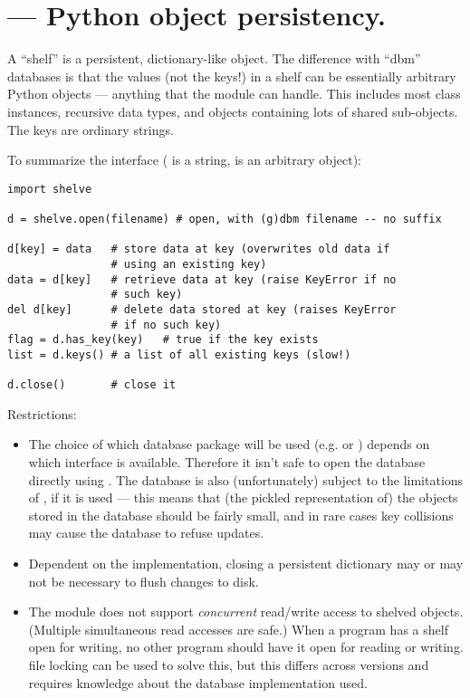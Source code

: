 \section{ ---
         Python object persistency.}



A ``shelf'' is a persistent, dictionary-like object.  The difference
with ``dbm'' databases is that the values (not the keys!) in a shelf
can be essentially arbitrary Python objects --- anything that the
 module can handle.  This includes most class instances,
recursive data types, and objects containing lots of shared
sub-objects.  The keys are ordinary strings.

To summarize the interface ( is a string,  is an
arbitrary object):

\begin{verbatim}
import shelve

d = shelve.open(filename) # open, with (g)dbm filename -- no suffix

d[key] = data   # store data at key (overwrites old data if
                # using an existing key)
data = d[key]   # retrieve data at key (raise KeyError if no
                # such key)
del d[key]      # delete data stored at key (raises KeyError
                # if no such key)
flag = d.has_key(key)   # true if the key exists
list = d.keys() # a list of all existing keys (slow!)

d.close()       # close it
\end{verbatim}
%
Restrictions:

\begin{itemize}

\item
The choice of which database package will be used (e.g.  or
)
depends on which interface is available.  Therefore it isn't safe to
open the database directly using .  The database is also
(unfortunately) subject to the limitations of , if it is used ---
this means that (the pickled representation of) the objects stored in
the database should be fairly small, and in rare cases key collisions
may cause the database to refuse updates.

\item
Dependent on the implementation, closing a persistent dictionary may
or may not be necessary to flush changes to disk.

\item
The  module does not support \emph{concurrent} read/write
access to shelved objects.  (Multiple simultaneous read accesses are
safe.)  When a program has a shelf open for writing, no other program
should have it open for reading or writing.  \UNIX{} file locking can
be used to solve this, but this differs across \UNIX{} versions and
requires knowledge about the database implementation used.

\end{itemize}
